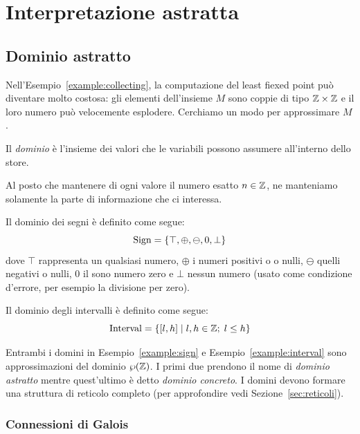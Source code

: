 \chapter{Interpretazione astratta}



\section{Dominio astratto}

Nell'Esempio~\ref{example:collecting}, la computazione del least fiexed point può diventare molto costosa: gli elementi dell'insieme $M$ sono coppie di tipo $\mathbb{Z} \times \mathbb{Z}$ e il loro numero può velocemente esplodere. Cerchiamo un modo per approssimare $M$. 

\begin{definition}[Dominio]
Il \emph{dominio} è l'insieme dei valori che le variabili possono assumere all'interno dello store. 
\end{definition}

Al posto che mantenere di ogni valore il numero esatto $n \in \mathbb{Z}$, ne manteniamo solamente la parte di informazione che ci interessa.

\begin{example}\label{example:sign}
Il dominio dei segni è definito come segue:
\[ \mathrm{Sign} = \{ \top, \oplus, \ominus, 0, \bot \} \]
dove $\top$ rappresenta un qualsiasi numero, $\oplus$ i numeri positivi o o nulli, $\ominus$ quelli negativi o nulli, $0$ il sono numero zero e $\bot$ nessun numero (usato come condizione d'errore, per esempio la divisione per zero). 
\end{example}

\begin{example}\label{example:interval}
Il dominio degli intervalli è definito come segue:
\[ \mathrm{Interval} = \{ [l,h] \mid l,h \in \mathbb{Z}; \; l \le h \} \]
\end{example}

Entrambi i domini in Esempio~\ref{example:sign} e Esempio~\ref{example:interval} sono approssimazioni del dominio $\wp(\mathbb{Z})$. I primi due prendono il nome di \emph{dominio astratto} mentre quest'ultimo è detto \emph{dominio concreto}. I domini devono formare una struttura di reticolo completo (per approfondire vedi Sezione~\ref{sec:reticoli}).

\subsection{Connessioni di Galois}\label{sec:galois-c}

